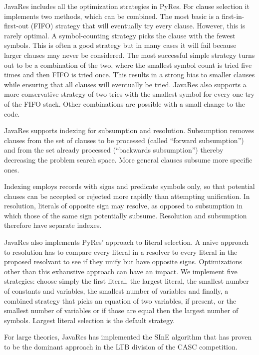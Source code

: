\documentclass{llncs}
\begin{document}
JavaRes includes all the optimization strategies in PyRes.  For clause
selection it implements two methods, which can be combined.  The most
basic is a first-in-first-out (FIFO) strategy that will eventually try every
clause.  However, this is rarely optimal.  A symbol-counting strategy
picks the clause with the fewest symbols.  This is often a good
strategy but in many cases it will fail because larger clauses may
never be considered.  The most successful simple strategy turns out to
be a combination of the two, where the smallest symbol count is tried
five times and then FIFO is tried once.  This results in a strong bias
to smaller clauses while ensuring that all clauses will eventually be
tried.  JavaRes also supports a more conservative strategy of two tries
with the smallest symbol for every one try of the FIFO stack.  Other
combinations are possible with a small change to the code.

JavaRes supports indexing for subsumption and resolution.  Subsumption
removes clauses from the set of clauses to be processed (called
``forward subsumption'') and from the set already processed (``backwards
subsumption'') thereby decreasing the problem search space.  More
general clauses subsume more specific ones.

Indexing employs
records with signs and predicate symbols only, so that potential clauses can
be accepted or rejected more rapidly than attempting unification.  In resolution, literals of opposite sign may resolve,
as opposed to subsumption in which those of the same sign potentially subsume.
Resolution and subsumption therefore have separate indexes.

JavaRes also implements PyRes' approach to literal selection.  A naive
approach to resolution has to compare every literal in a resolver to
every literal in the proposed resolvant to see if they unify but have
opposite signs.  Optimizations other than this exhaustive approach can
have an impact.  We implement five strategies: choose simply the first
literal, the largest literal, the smallest number of constants and
variables, the smallest number of variables and finally, a combined
strategy that picks an equation of two variables, if present, or the
smallest number of variables or if those are equal then the largest
number of symbols.  Largest literal selection is the default strategy.

For large theories, JavaRes has implemented the SInE
algorithm\cite{HV:CADE-2011} that has proven to be the dominant approach in the
LTB division of the CASC competition.
\end{document}
